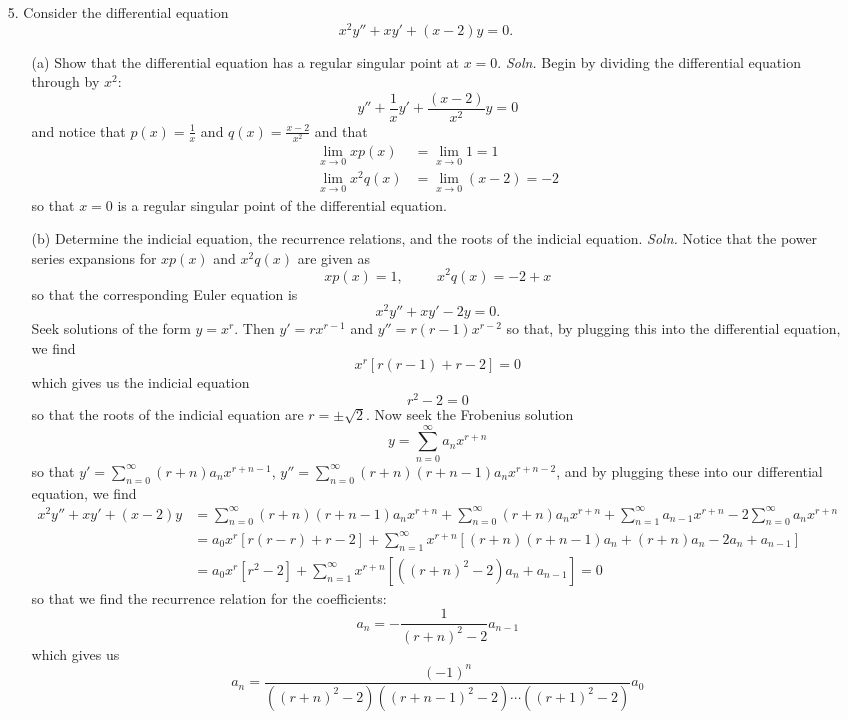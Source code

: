 \documentclass{article}
\begin{document}
\begin{itemize}
    
    \pagebreak
    \item[5.] Consider the differential equation 
    \[x^2y'' + xy' + (x - 2)y = 0.\]
    \begin{itemize}
        \item[(a)] Show that the differential equation has a regular singular point at $x = 0.$
        \newline\newline
        \textit{Soln.} Begin by dividing the differential equation through by $x^2$:
        \[y'' + \frac{1}{x}y' + \frac{(x - 2)}{x^2}y = 0\]
        and notice that $p(x) = \frac{1}{x}$ and $q(x) = \frac{x - 2}{x^2}$ and that
        \begin{align*}
            \lim_{x \to 0} xp(x) &= \lim_{x \to 0} 1 = 1\\
            \lim_{x \to 0} x^2q(x) &= \lim_{x \to 0} (x - 2) = -2
        \end{align*}
        so that $x = 0$ is a regular singular point of the differential equation. \newline\newline

        \item[(b)] Determine the indicial equation, the recurrence relations, and the roots of the indicial equation.
        \newline\newline
        \textit{Soln.} Notice that the power series expansions for $xp(x)$ and $x^2q(x)$ are given as
        \[xp(x) = 1, \hspace{1cm} x^2q(x) = -2 + x\]
        so that the corresponding Euler equation is
        \[x^2y'' + xy' - 2y = 0.\]
        Seek solutions of the form $y = x^r$. Then $y' = rx^{r - 1}$ and $y'' = r(r-1)x^{r - 2}$ so that, by plugging this into the differential equation, we find
        \[x^r[r(r - 1) + r - 2] = 0\]
        which gives us the indicial equation
        \[r^2 - 2 = 0\]
        so that the roots of the indicial equation are $r = \pm \sqrt{2}$. Now seek the Frobenius solution 
        \[y = \sum_{n = 0}^{\infty} a_n x^{r + n}\]
        so that $y' = \sum_{n = 0}^{\infty} (r + n) a_n x^{r + n - 1}$, $y'' = \sum_{n = 0}^{\infty} (r + n)(r + n-1)a_n x^{r + n-2}$, and by plugging these into our differential equation, we find
        \begin{align*}
            x^2y'' + xy' + (x - 2)y &= \sum_{n = 0}^{\infty} (r + n)(r + n - 1)a_nx^{r + n} + \sum_{n = 0}^{\infty} (r+ n)a_n x^{r + n} + \sum_{n = 1}^{\infty}a_{n - 1}x^{r + n} - 2\sum_{n = 0}^{\infty} a_nx^{r + n}\\
            &= a_0x^r [r(r - r) + r - 2] + \sum_{n = 1}^{\infty}x^{r+ n} [(r + n)(r + n - 1)a_n + (r+n)a_n -2a_n + a_{n-1}]\\
            &= a_0x^r[r^2 - 2] + \sum_{n = 1}^{\infty} x^{r + n}[((r+n)^2 - 2)a_n + a_{n-1}] = 0
        \end{align*}
        so that we find the recurrence relation for the coefficients:
        \[a_n = -\frac{1}{(r + n)^2-2}a_{n - 1}\]
        which gives us
        \[a_n = \frac{(-1)^n}{((r + n)^2 - 2)((r + n-1)^2 - 2)\cdots ((r + 1)^2-2)}a_0\]
        


\end{itemize}
\end{itemize}
\end{document}
